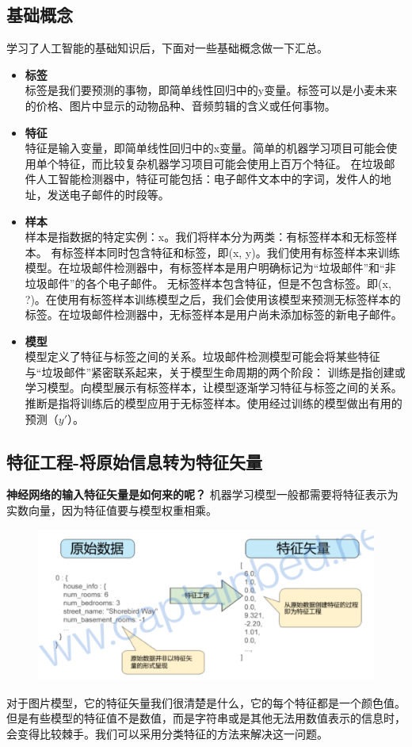 \subsection{基础概念}
学习了人工智能的基础知识后，下面对一些基础概念做一下汇总。
\begin{itemize}
	\item \textbf{标签} \\
	标签是我们要预测的事物，即简单线性回归中的y变量。标签可以是小麦未来的价格、图片中显示的动物品种、音频剪辑的含义或任何事物。
	\item \textbf{特征}  \\
	特征是输入变量，即简单线性回归中的x变量。简单的机器学习项目可能会使用单个特征，而比较复杂机器学习项目可能会使用上百万个特征。
	在垃圾邮件人工智能检测器中，特征可能包括：电子邮件文本中的字词，发件人的地址，发送电子邮件的时段等。
	\item \textbf{样本} \\
	样本是指数据的特定实例：x。我们将样本分为两类：有标签样本和无标签样本。
	有标签样本同时包含特征和标签，即(x, y)。我们使用有标签样本来训练模型。在垃圾邮件检测器中，有标签样本是用户明确标记为“垃圾邮件”和“非垃圾邮件”的各个电子邮件。
	无标签样本包含特征，但是不包含标签。即(x, ?)。在使用有标签样本训练模型之后，我们会使用该模型来预测无标签样本的标签。在垃圾邮件检测器中，无标签样本是用户尚未添加标签的新电子邮件。
	\item \textbf{模型} \\
	模型定义了特征与标签之间的关系。垃圾邮件检测模型可能会将某些特征与“垃圾邮件”紧密联系起来，关于模型生命周期的两个阶段：
	训练是指创建或学习模型。向模型展示有标签样本，让模型逐渐学习特征与标签之间的关系。
	推断是指将训练后的模型应用于无标签样本。使用经过训练的模型做出有用的预测（$y'$）。
\end{itemize}

\subsection{特征工程-将原始信息转为特征矢量}
\textbf{神经网络的输入特征矢量是如何来的呢？} 
机器学习模型一般都需要将特征表示为实数向量，因为特征值要与模型权重相乘。
\begin{figure}
	\centering
	\includegraphics[width=0.7\linewidth]{pictures/特征工程/vector1}
	\caption{}
	\label{fig:vector1}
\end{figure}
对于图片模型，它的特征矢量我们很清楚是什么，它的每个特征都是一个颜色值。但是有些模型的特征值不是数值，而是字符串或是其他无法用数值表示的信息时，会变得比较棘手。我们可以采用分类特征的方法来解决这一问题。

